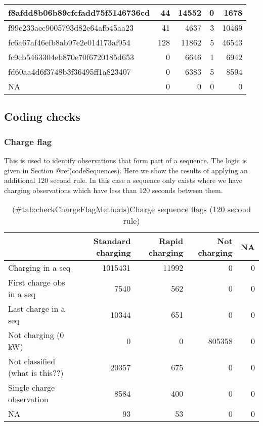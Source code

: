 \documentclass[]{article}
\newenvironment{Shaded}{\begin{snugshade}}{\end{snugshade}}
\newcommand{\DataTypeTok}[1]{\textcolor[rgb]{0.13,0.29,0.53}{#1}}
\newcommand{\KeywordTok}[1]{\textcolor[rgb]{0.13,0.29,0.53}{\textbf{#1}}}
\newcommand{\NormalTok}[1]{#1}
\newcommand{\OperatorTok}[1]{\textcolor[rgb]{0.81,0.36,0.00}{\textbf{#1}}}
\newcommand{\StringTok}[1]{\textcolor[rgb]{0.31,0.60,0.02}{#1}}
\begin{document}
\begin{table}[t]
\begin{tabular}{l|r|r|r|r}
\hline
f8afdd8b06b89cfcfadd75f5146736cd & 44 & 14552 & 0 & 1678\\
\hline
f99c233aec9005793d82e64afb45aa23 & 41 & 4637 & 3 & 10469\\
\hline
fc6a67af46efb8ab97e2e014173af954 & 128 & 11862 & 5 & 46543\\
\hline
fc9cb5463304eb870e70f6720185d653 & 0 & 6646 & 1 & 6942\\
\hline
fd60aa4d6f3748b3f36495ff1a823407 & 0 & 6383 & 5 & 8594\\
\hline
NA & 0 & 0 & 0 & 0\\
\hline
\end{tabular}
\end{table}

\hypertarget{coding-checks}{%
\subsection{Coding checks}\label{coding-checks}}

\hypertarget{chargeFlagTest}{%
\subsubsection{Charge flag}\label{chargeFlagTest}}

This is used to identify observations that form part of a sequence. The logic is given in Section @ref(codeSequences). Here we show the results of applying an additional 120 second rule. In this case a sequence only exists where we have charging observations which have less than 120 seconds between them.

\begin{Shaded}
\end{Shaded}

\begin{table}[t]

\caption{(\#tab:checkChargeFlagMethods)Charge sequence flags (120 second rule)}
\centering
\begin{tabular}{l|r|r|r|r}
\hline
  & Standard charging & Rapid charging & Not charging & NA\\
\hline
Charging in a seq & 1015431 & 11992 & 0 & 0\\
\hline
First charge obs in a seq & 7540 & 562 & 0 & 0\\
\hline
Last charge in a seq & 10344 & 651 & 0 & 0\\
\hline
Not charging (0 kW) & 0 & 0 & 805358 & 0\\
\hline
Not classified (what is this??) & 20357 & 675 & 0 & 0\\
\hline
Single charge observation & 8584 & 400 & 0 & 0\\
\hline
NA & 93 & 53 & 0 & 0\\
\hline
\end{tabular}
\end{table}
\end{document}
